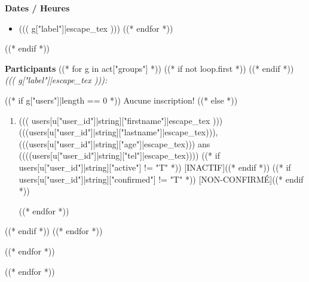 \documentclass [parskip=full, paper=a4paper]{scrbook}
\begin{document}
\textbf{Dates / Heures}
\medskip

\begin{itemize}[noitemsep]
((* for g in act["groups"] *))
\item ((( g["label"]|escape_tex )))
((* endfor *))
\end{itemize}
((* endif *))


\medskip

\clearpage
\textbf{Participants}
\medskip
((* for g in act["groups"] *))
((* if not loop.first *))
\clearpage
((* endif *))
\textit{((( g["label"]|escape_tex ))):}

((* if g["users"]|length == 0 *))
Aucune inscription!
((* else *))
\begin{enumerate}[noitemsep]
((* for u in g["users"] *))
\item ((( users[u["user_id"]|string]["firstname"]|escape_tex )))
(((users[u["user_id"]|string]["lastname"]|escape_tex))),
(((users[u["user_id"]|string]["age"]|escape_tex))) ans
{(}(((users[u["user_id"]|string]["tel"]|escape_tex))){)}
((* if users[u["user_id"]|string]["active"] != "T" *)) [INACTIF]((* endif *))
((* if users[u["user_id"]|string]["confirmed"] != "T" *)) [NON-CONFIRMÉ]((* endif *))

((* endfor *))
\end{enumerate}
((* endif *))
((* endfor *))


((* endfor *))

((* endfor *))
\end{document}
